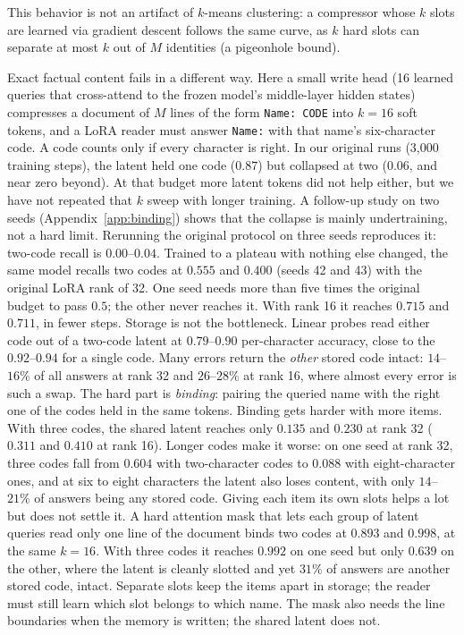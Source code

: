 This behavior is not an artifact of $k$-means clustering: a compressor whose $k$ slots are learned via gradient descent follows the same curve, as $k$ hard slots can separate at most $k$ out of $M$ identities (a pigeonhole bound).

Exact factual content fails in a different way. Here a small write head (16 learned queries that cross-attend to the frozen model's middle-layer hidden states) compresses a document of $M$ lines of the form \texttt{Name: CODE} into $k{=}16$ soft tokens, and a LoRA reader must answer \texttt{Name:} with that name's six-character code. A code counts only if every character is right. In our original runs (3{,}000 training steps), the latent held one code ($0.87$) but collapsed at two ($0.06$, and near zero beyond). At that budget more latent tokens did not help either, but we have not repeated that $k$ sweep with longer training. A follow-up study on two seeds (Appendix~\ref{app:binding}) shows that the collapse is mainly undertraining, not a hard limit. Rerunning the original protocol on three seeds reproduces it: two-code recall is $0.00$--$0.04$. Trained to a plateau with nothing else changed, the same model recalls two codes at $0.555$ and $0.400$ (seeds 42 and 43) with the original LoRA rank of 32. One seed needs more than five times the original budget to pass $0.5$; the other never reaches it. With rank 16 it reaches $0.715$ and $0.711$, in fewer steps. Storage is not the bottleneck. Linear probes read either code out of a two-code latent at $0.79$--$0.90$ per-character accuracy, close to the $0.92$--$0.94$ for a single code. Many errors return the \emph{other} stored code intact: $14$--$16\%$ of all answers at rank 32 and $26$--$28\%$ at rank 16, where almost every error is such a swap. The hard part is \emph{binding}: pairing the queried name with the right one of the codes held in the same tokens. Binding gets harder with more items. With three codes, the shared latent reaches only $0.135$ and $0.230$ at rank 32 ($0.311$ and $0.410$ at rank 16). Longer codes make it worse: on one seed at rank 32, three codes fall from $0.604$ with two-character codes to $0.088$ with eight-character ones, and at six to eight characters the latent also loses content, with only $14$--$21\%$ of answers being any stored code. Giving each item its own slots helps a lot but does not settle it. A hard attention mask that lets each group of latent queries read only one line of the document binds two codes at $0.893$ and $0.998$, at the same $k{=}16$. With three codes it reaches $0.992$ on one seed but only $0.639$ on the other, where the latent is cleanly slotted and yet $31\%$ of answers are another stored code, intact. Separate slots keep the items apart in storage; the reader must still learn which slot belongs to which name. The mask also needs the line boundaries when the memory is written; the shared latent does not.

